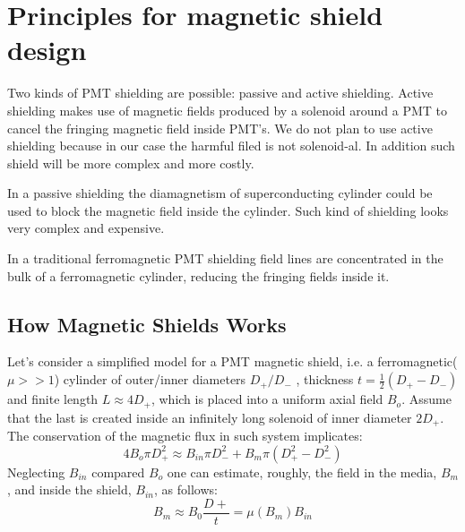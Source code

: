 \documentclass[12pt]{article}
\begin{document}
\section{Principles for  magnetic shield design}

Two  kinds of PMT shielding are possible:
 passive and active shielding. 
Active shielding makes use of  magnetic fields 
produced by a  solenoid  around a PMT to cancel the 
fringing magnetic field inside  PMT's.
We do not plan to use active shielding 
 because in our case the  harmful filed
is  not solenoid-al. In addition such shield  will be 
 more complex and more costly.

In a passive shielding  the diamagnetism 
of superconducting cylinder could be   used 
to block the magnetic field  inside the cylinder.
Such  kind of shielding looks very complex and expensive.

In a traditional ferromagnetic PMT  shielding 
field lines are concentrated in the bulk of a 
ferromagnetic cylinder, reducing the fringing fields inside it.  
%
%


\subsection{How Magnetic Shields Works}
Let's consider a simplified  model for a PMT  magnetic shield, 
i.e. a ferromagnetic($\mu>>1$)
cylinder of outer/inner  diameters $D_+/D_-$ , thickness 
$t=\frac{1}{2}(D_+-D_-)$ and finite length $L\approx 4D_+$, which is 
 placed into a uniform axial  field $B_o$. Assume that the last  is created
 inside an infinitely long  solenoid of inner diameter  $2D_+$.
The conservation of the magnetic flux in such system implicates:
 \begin{equation}
4B_o \pi D_+^2 \approx B_{in} \pi D_-^2 + B_m \pi (D_+^2-D_-^2)
\label{eq004}
\end{equation}
Neglecting $B_{in}$ compared $B_o$ one can  
estimate, roughly,  the field in the media, $B_m$, and inside the shield, $B_{in}$, as follows:
 \begin{equation}
B_m  \approx B_0\frac{D+}{t}=\mu(B_m)B_{in}
\label{eq003}
\end{equation}
\end{document}
